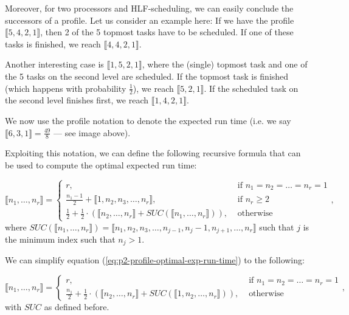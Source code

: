 \newcommand{\profile}[1]{\llbracket #1 \rrbracket}

Moreover, for two processors and HLF-scheduling, we can easily conclude the successors of a profile. Let us consider an example here: If we have the profile $\llbracket 5,4,2,1 \rrbracket$, then 2 of the 5 topmost tasks have to be scheduled. If one of these tasks is finished, we reach $\profile{4,4,2,1}$.

Another interesting case is $\profile{1,5,2,1}$, where the (single) topmost task and one of the 5 tasks on the second level are scheduled. If the topmost task is finished (which happens with probability $\frac{1}{2}$), we reach $\profile{5,2,1}$. If the scheduled task on the second level finishes first, we reach $\profile{1,4,2,1}$.

We now use the profile notation to denote the expected run time (i.e. we say $\profile{6,3,1} = \frac{49}{8}$ --- see image above).

Exploiting this notation, we can define the following recursive formula that can be used to compute the optimal expected run time:

\begin{equation}
  \label{eq:p2-profile-optimal-exp-run-time}
  \profile{n_1, \dots, n_r} =
  \begin{cases}
    r, & \text{ if } n_1 = n_2 = \dots = n_r = 1 \\
    \frac{n_1-1}{2} + \profile{1, n_2, n_3, \dots, n_r} , & \text{ if } n_r\geq 2 \\
    \frac{1}{2} + \frac{1}{2} \cdot \left( \profile{n_2, \dots, n_r} + SUC(\profile{n_1,\dots,n_r}) \right) ,& \text{ otherwise }
  \end{cases},
\end{equation}
where $SUC(\profile{n_1,\dots,n_r}) = \profile{n_1, n_2, n_3,\dots,n_{j-1},n_j-1,n_{j+1},\dots,n_r}$ such that $j$ is the minimum index such that $n_j>1$.

We can simplify equation (\ref{eq:p2-profile-optimal-exp-run-time}) to the following:

\begin{equation}
  \label{eq:p2-profile-optimal-exp-run-time-def-simplified}
  \profile{n_1, \dots, n_r} =
  \begin{cases}
    r, & \text{ if } n_1 = n_2 = \dots = n_r = 1 \\
    \frac{n_1}{2} + \frac{1}{2} \cdot \left( \profile{n_2, \dots, n_r} + SUC(\profile{1,n_2,\dots,n_r}) \right) ,& \text{ otherwise }
  \end{cases},
\end{equation}
with $SUC$ as defined before.

